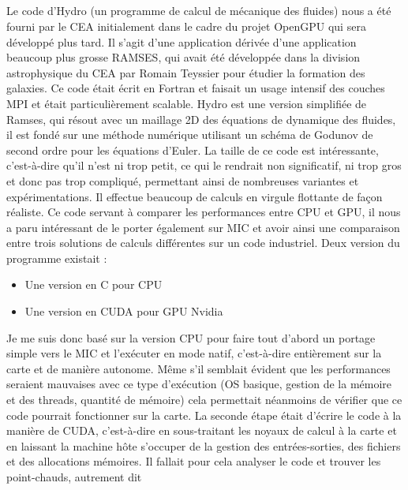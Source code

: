 \documentclass{article}
\begin{document}
					\subparagraph{}
					Le code d'Hydro (un programme de calcul de mécanique des fluides) nous a été fourni par le CEA initialement 
					dans le cadre du projet OpenGPU qui sera développé plus tard. Il s'agit d'une application dérivée d'une 
					application beaucoup plus grosse RAMSES, qui avait été développée dans la division astrophysique du CEA 
					par Romain Teyssier pour étudier la formation des galaxies. Ce code était écrit en Fortran et faisait un 
					usage intensif des couches MPI et était particulièrement scalable. Hydro est une version simplifiée de 
					Ramses, qui résout avec un maillage 2D des équations de dynamique des fluides, il est fondé sur une 
					méthode numérique utilisant un schéma de Godunov de second ordre pour les équations d'Euler.
					La taille de ce code est intéressante, c'est-à-dire qu'il n'est ni trop petit, ce qui le rendrait non 
					significatif, ni trop gros et donc pas trop compliqué, permettant ainsi de nombreuses variantes et 
					expérimentations. Il effectue beaucoup de calculs en virgule flottante de façon réaliste. Ce code servant à 
					comparer les performances entre CPU et GPU, il nous a paru intéressant de le porter également sur 
					MIC et avoir ainsi une comparaison entre trois solutions de calculs différentes sur un code industriel. \newline
					Deux version du programme existait : \newline
					\begin{itemize}
					\item Une version en C pour CPU
					\item Une version en CUDA pour GPU Nvidia \newline
					\end{itemize}
					Je me suis donc basé sur la version CPU pour faire tout d'abord un portage simple vers le MIC et l'exécuter 
					en mode natif, c'est-à-dire entièrement sur la carte et de manière autonome. Même s'il semblait évident 
					que les performances seraient mauvaises avec ce type d'exécution (OS basique, gestion de la mémoire et des 
					threads, quantité de mémoire) cela permettait néanmoins de vérifier que ce code pourrait fonctionner sur la 
					carte. \newline
					La seconde étape était d'écrire le code à la manière de CUDA, c'est-à-dire en sous-traitant les noyaux de 
					calcul à la carte et en laissant la machine hôte s'occuper de la gestion des entrées-sorties, des fichiers et 
					des allocations mémoires. Il fallait pour cela analyser le code et trouver les point-chauds, autrement dit 
\end{document}

